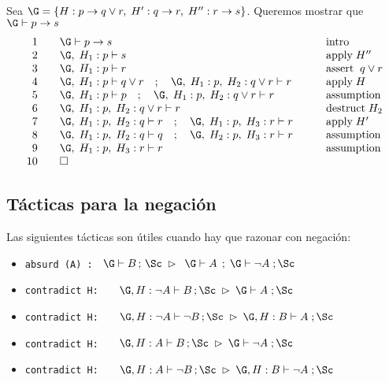 \documentclass[11pt,letterpaper]{article}
\begin{document}
\item Sea
$\G=\{H:p \to q \lor  r ,\; H': q\to r,\;H'': r\to s\}$. 
Queremos mostrar que $\G\vdash p\to s $ 
\[
\begin{array}{rll}
1\quad & \G\vdash p\to s &  \qquad \mbox{intro} \\
2 \quad & \G,\;H_1: p \vdash s & \qquad \mbox {apply}\; H'' \\ %
3 \quad & \G,\;H_1: p \vdash r & \qquad \mbox{assert} \;\; q \lor r \\
4 \quad & \G,\;H_1: p\vdash q\lor r\quad  ; \quad  \G,\;H_1: p,\;H_2: q\lor 
r\vdash r &  \qquad \mbox{apply}\; H \\ %
5 \quad & \G,\;H_1: p\vdash p\quad  ; \quad  \G,\;H_1: p,\;H_2: q\lor r\vdash 
r& \qquad \mbox{assumption} \\ 
6 \quad & \G,\;H_1: p,\;H_2: q\lor r\vdash r & \qquad \mbox{destruct} \;H_2 \\ 
7\quad & \G,\;H_1: p,\;H_2: q \vdash r \quad  ; \quad  \G,\;H_1: p,\;H_3: r 
\vdash r &  \qquad \mbox{apply}\; H' \\ %
8 \quad & \G,\;H_1: p,\;H_2: q \vdash q \quad  ; \quad  \G,\;H_2: p,\;H_3: r 
\vdash r & \qquad \mbox{assumption} \\
9 \quad & \G,\;H_1: p,\;H_3: r \vdash r & \qquad  \mbox{assumption} \\
10 \quad & \square & 
\end{array}
\]
\ei


\subsection{Tácticas para la negación}
Las siguientes tácticas son útiles cuando hay que razonar con negación:

\begin{itemize}
 \item \texttt{absurd (A) : }  
  $\G \vdash B \, ; \, \Sc\;\rhd\;\;\G \vdash A \, \; ;\;\G\vdash \neg A\; ;\Sc$
 \item \texttt{contradict H: } 
  $\quad \G, H:\neg A\vdash B \,;\Sc\;\rhd\;\G\vdash A\; ;\Sc$
 \item \texttt{contradict H: } 
  $\quad \G, H:\neg A\vdash \neg B \,;\Sc\;\rhd\;\G, H:B\vdash A\; ;\Sc$
 \item \texttt{contradict H: } 
  $\quad \G, H: A\vdash B \, ;\Sc\;\rhd\;\G\vdash \neg A\; ;\Sc$
 \item \texttt{contradict H: } 
  $\quad \G, H: A\vdash \neg B \, ;\Sc\;\rhd\;\G, H:B\vdash \neg A\; ;\Sc$
\end{itemize}
\end{document}
